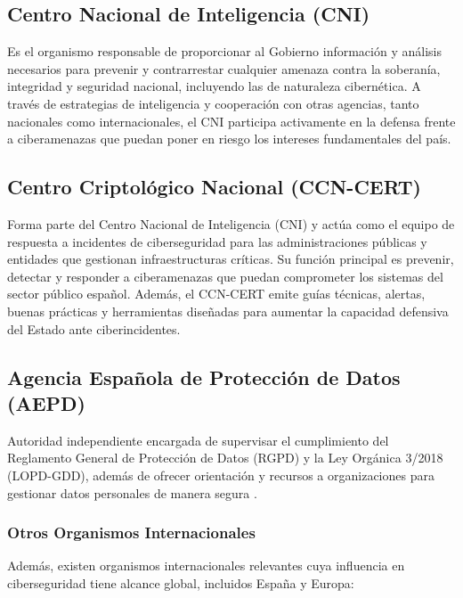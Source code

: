 \documentclass[a4paper, 11pt]{article}
\begin{document}
\subsection*{Centro Nacional de Inteligencia (CNI)}

Es el organismo responsable de proporcionar al Gobierno información y análisis necesarios para prevenir y contrarrestar cualquier amenaza contra la soberanía, integridad y seguridad nacional, incluyendo las de naturaleza cibernética. A través de estrategias de inteligencia y cooperación con otras agencias, tanto nacionales como internacionales, el CNI participa activamente en la defensa frente a ciberamenazas que puedan poner en riesgo los intereses fundamentales del país. \cite{cni}


\subsection*{Centro Criptológico Nacional (CCN-CERT)}

Forma parte del Centro Nacional de Inteligencia (CNI) y actúa como el equipo de respuesta a incidentes de ciberseguridad para las administraciones públicas y entidades que gestionan infraestructuras críticas. Su función principal es prevenir, detectar y responder a ciberamenazas que puedan comprometer los sistemas del sector público español. Además, el CCN-CERT emite guías técnicas, alertas, buenas prácticas y herramientas diseñadas para aumentar la capacidad defensiva del Estado ante ciberincidentes. \cite{ccncert}

\subsection*{Agencia Española de Protección de Datos (AEPD)}

Autoridad independiente encargada de supervisar el cumplimiento del Reglamento General de Protección de Datos (RGPD) y la Ley Orgánica 3/2018 (LOPD-GDD), además de ofrecer orientación y recursos a organizaciones para gestionar datos personales de manera segura \cite{aepd}.

\subsubsection{Otros Organismos Internacionales}

Además, existen organismos internacionales relevantes cuya influencia en ciberseguridad tiene alcance global, incluidos España y Europa:
\end{document}
